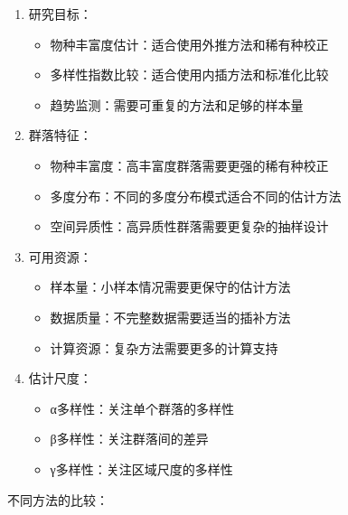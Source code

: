 \documentclass[
  twoside,12pt,fontset=none]{ctexbook}
\providecommand{\tightlist}{%
  \setlength{\itemsep}{0pt}\setlength{\parskip}{0pt}}
\begin{document}
\begin{enumerate}
\def\labelenumi{\arabic{enumi}.}
\tightlist
\item
  研究目标：

  \begin{itemize}
  \tightlist
  \item
    物种丰富度估计：适合使用外推方法和稀有种校正
  \item
    多样性指数比较：适合使用内插方法和标准化比较
  \item
    趋势监测：需要可重复的方法和足够的样本量
  \end{itemize}
\item
  群落特征：

  \begin{itemize}
  \tightlist
  \item
    物种丰富度：高丰富度群落需要更强的稀有种校正
  \item
    多度分布：不同的多度分布模式适合不同的估计方法
  \item
    空间异质性：高异质性群落需要更复杂的抽样设计
  \end{itemize}
\item
  可用资源：

  \begin{itemize}
  \tightlist
  \item
    样本量：小样本情况需要更保守的估计方法
  \item
    数据质量：不完整数据需要适当的插补方法
  \item
    计算资源：复杂方法需要更多的计算支持
  \end{itemize}
\item
  估计尺度：

  \begin{itemize}
  \tightlist
  \item
    α多样性：关注单个群落的多样性
  \item
    β多样性：关注群落间的差异
  \item
    γ多样性：关注区域尺度的多样性
  \end{itemize}
\end{enumerate}

不同方法的比较：
\end{document}
